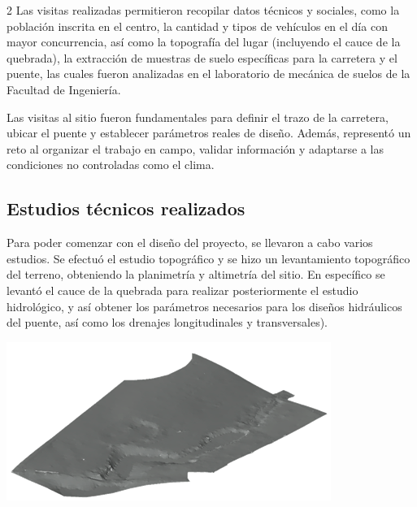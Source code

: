 \documentclass[12pt,spanish,Letterpaper,openany]{book}
\begin{document}
\begin {multicols}{2}
Las visitas realizadas permitieron recopilar datos técnicos y sociales, como la población inscrita en el centro, la cantidad y tipos de vehículos en el día con mayor concurrencia, así como la topografía del lugar (incluyendo el cauce de la quebrada), la extracción de muestras de suelo específicas para la carretera y el puente, las cuales fueron analizadas en el laboratorio de mecánica de suelos de la Facultad de Ingeniería.

Las visitas al sitio fueron fundamentales para definir el trazo de la carretera, ubicar el puente y establecer parámetros reales de diseño. Además, representó un reto al organizar el trabajo en campo, validar información y adaptarse a las condiciones no controladas como el clima.

\hypertarget{estudios-tuxe9cnicos-realizados}{%
\subsection{Estudios técnicos realizados}\label{estudios-tuxe9cnicos-realizados}}

Para poder comenzar con el diseño del proyecto, se llevaron a cabo varios estudios. Se efectuó el estudio topográfico y se hizo un levantamiento topográfico del terreno, obteniendo la planimetría y altimetría del sitio. En específico se levantó el cauce de la quebrada para realizar posteriormente el estudio hidrológico, y así obtener los parámetros necesarios para los diseños hidráulicos del puente, así como los drenajes longitudinales y transversales).

\begin {flushleft}
\noindent\begin{minipage}[c]{\columnwidth}

\textbf{}

\begin{center}\includegraphics[width=1\linewidth]{imagenes_articulos/art03_01} \end{center}


\end{minipage}
\end{flushleft}
\end{multicols}
\end{document}
